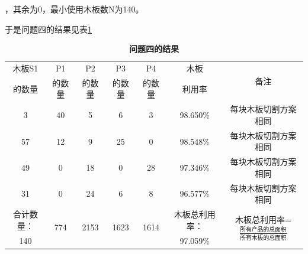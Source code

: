 \documentclass[hyperref,UTF8]{article}
\begin{document}
{ ，其余为0，最小使用木板数N为140。\par 于是问题四的结果见表\ref{tab:quastion4}
\begin{table}[htbp]
  \centering
  \caption{\textbf{问题四的结果}}
    \begin{tabular}{|c|c|c|c|c|c|c|}
    \hline
    木板S1 & P1 &P2&P3 &P4& 木板 &\multicolumn{1}{c|}{\multirow{2}[0]{*}{备注}} \\\bigstrut
    的数量&的数量&的数量&的数量&的数量&利用率&\\\hline
    3 & 40 & 5 & 6 & 3 & 98.650\% & 每块木板切割方案相同\\\hline
    57 & 12 & 9 & 25 & 0 &98.548\% & 每块木板切割方案相同\\\hline
    49 & 0 & 18 & 0 & 28 & 97.346\% & 每块木板切割方案相同 \\\hline
    31 & 0 & 24 & 6 & 8 & 96.577\% & 每块木板切割方案相同 \\\hline
    合计数量：  & \multicolumn{1}{c|}{\multirow{2}[0]{*}{774}} & \multicolumn{1}{c|}{\multirow{2}[0]{*}{2153}} & \multicolumn{1}{c|}{\multirow{2}[0]{*}{1623}} & \multicolumn{1}{c|}{\multirow{2}[0]{*}{1614}} & 木板总利用率： &\multicolumn{1}{c|}{\multirow{2}[0]{*}{木板总利用率=$\frac{\mbox{所有产品的总面积}}{\mbox{所有木板的总面积}}$}}\\
    140&           &      &      &      &   97.059\%   &                                 \\\hline
    \end{tabular}%
  \label{tab:quastion4}%
\end{table}%

}
\end{document}
